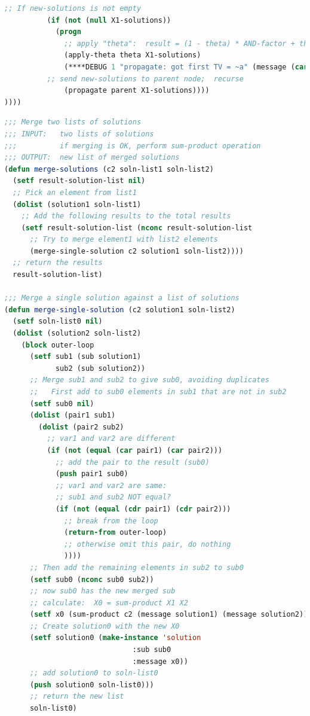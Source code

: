 \begin{lstlisting}[language=Lisp]
          ;; If new-solutions is not empty
          (if (not (null X1-solutions))
            (progn
              ;; apply "theta":  result = (1 - theta) * AND-factor + theta * OR-factor
              (apply-theta theta X1-solutions)
              (****DEBUG 1 "propagate: got first TV = ~a" (message (car X1-solutions)))
          ;; send new-solutions to parent node;  recurse
              (propagate parent X1-solutions))))
))))
\end{lstlisting}

\begin{lstlisting}[language=Lisp]
;;; Merge two lists of solutions
;;; INPUT:   two lists of solutions
;;;          if merging is OK, perform sum-product operation
;;; OUTPUT:  new list of merged solutions
(defun merge-solutions (c2 soln-list1 soln-list2)
  (setf result-solution-list nil)
  ;; Pick an element from list1
  (dolist (solution1 soln-list1)
    ;; Add the following results to the total results
    (setf result-solution-list (nconc result-solution-list
      ;; Try to merge element1 with list2 elements
      (merge-single-solution c2 solution1 soln-list2))))
  ;; return the results
  result-solution-list)

;;; Merge a single solution against a list of solutions
(defun merge-single-solution (c2 solution1 soln-list2)
  (setf soln-list0 nil)
  (dolist (solution2 soln-list2)
    (block outer-loop
      (setf sub1 (sub solution1)
            sub2 (sub solution2))
      ;; Merge sub1 and sub2 to give sub0, avoiding duplicates
      ;;   First add to sub0 elements in sub1 that are not in sub2
      (setf sub0 nil)
      (dolist (pair1 sub1)
        (dolist (pair2 sub2)
          ;; var1 and var2 are different
          (if (not (equal (car pair1) (car pair2)))
            ;; add the pair to the result (sub0)
            (push pair1 sub0)
            ;; var1 and var2 are same:
            ;; sub1 and sub2 NOT equal?
            (if (not (equal (cdr pair1) (cdr pair2)))
              ;; break from the loop
              (return-from outer-loop)
              ;; otherwise omit this pair, do nothing
              ))))
      ;; Then add the remaining elements in sub2 to sub0
      (setf sub0 (nconc sub0 sub2))
      ;; now sub0 has the new merged sub
      ;; calculate:  X0 = sum-product X1 X2
      (setf x0 (sum-product c2 (message solution1) (message solution2)))
      ;; Create solution0 with the new X0
      (setf solution0 (make-instance 'solution
                              :sub sub0
                              :message x0))
      ;; add solution0 to soln-list0
      (push solution0 soln-list0)))
      ;; return the new list
      soln-list0)
\end{lstlisting}